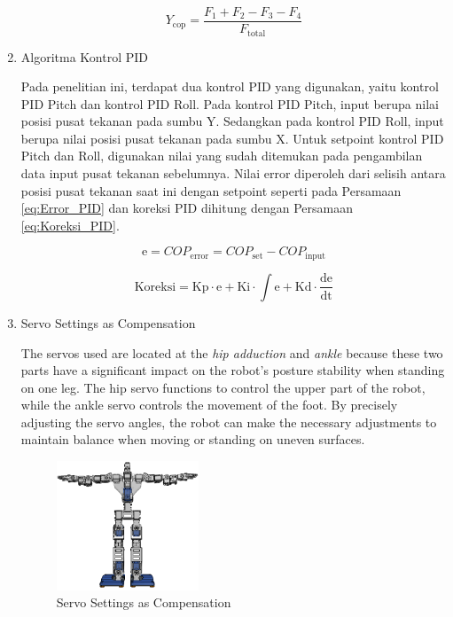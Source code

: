 \begin{enumerate}[label=\Alph*.]
    \begin{equation}
      Y_{\mathrm{cop}} = \frac{F_1 + F_2 - F_3 - F_4}{F_{\mathrm{total}}}
      \label{eq:COP_Y}
    \end{equation}

    \item Algoritma Kontrol PID
    \label{subsec:algoritmakontrolpid}

    \hspace*{1em} Pada penelitian ini, terdapat dua kontrol PID yang digunakan, yaitu kontrol PID Pitch dan kontrol PID Roll. Pada kontrol PID Pitch, input berupa nilai posisi pusat tekanan pada sumbu Y. Sedangkan pada kontrol PID Roll, input berupa nilai posisi pusat tekanan pada sumbu X. Untuk setpoint kontrol PID Pitch dan Roll, digunakan nilai yang sudah ditemukan pada pengambilan data input pusat tekanan sebelumnya. Nilai error diperoleh dari selisih antara posisi pusat tekanan saat ini dengan setpoint seperti pada Persamaan \ref{eq:Error_PID} dan koreksi PID dihitung dengan Persamaan \ref{eq:Koreksi_PID}.

    \begin{equation}
      \mathrm{e} = COP_{\mathrm{error}} = COP_{\mathrm{set}} - COP_{\mathrm{input}}
      \label{eq:Error_PID}
    \end{equation}

    \begin{equation}
      \mathrm{Koreksi} = \mathrm{Kp} \cdot \mathrm{e} + \mathrm{Ki} \cdot \int \mathrm{e} + \mathrm{Kd} \cdot \frac{\mathrm{de}}{\mathrm{dt}}
      \label{eq:Koreksi_PID}
    \end{equation}

    \item Servo Settings as Compensation
    \label{subsec:servosettings}

    \hspace*{1em} The servos used are located at the \textit{hip adduction} and \textit{ankle} because these two parts have a significant impact on the robot's posture stability when standing on one leg. The hip servo functions to control the upper part of the robot, while the ankle servo controls the movement of the foot. By precisely adjusting the servo angles, the robot can make the necessary adjustments to maintain balance when moving or standing on uneven surfaces.

    \begin{figure} [h] \centering
      \includegraphics[width=0.4\textwidth]{gambar/controlled_servo.png}
      \caption{Servo Settings as Compensation}
      \label{fig:Controlled_Servo}
    \end{figure}


\end{enumerate}
